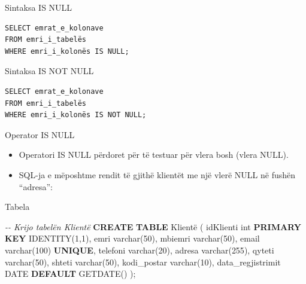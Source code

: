 \documentclass[
  ignorenonframetext,
]{beamer}
\newenvironment{Shaded}{\begin{snugshade}}{\end{snugshade}}
\newcommand{\CommentTok}[1]{\textcolor[rgb]{0.56,0.35,0.01}{\textit{#1}}}
\newcommand{\DataTypeTok}[1]{\textcolor[rgb]{0.13,0.29,0.53}{#1}}
\newcommand{\DecValTok}[1]{\textcolor[rgb]{0.00,0.00,0.81}{#1}}
\newcommand{\KeywordTok}[1]{\textcolor[rgb]{0.13,0.29,0.53}{\textbf{#1}}}
\newcommand{\NormalTok}[1]{#1}
\begin{document}
\begin{frame}[fragile]{Sintaksa IS NULL}
\label{sintaksa-is-null}

\begin{verbatim}
SELECT emrat_e_kolonave
FROM emri_i_tabelës
WHERE emri_i_kolonës IS NULL;
\end{verbatim}
\end{frame}

\begin{frame}[fragile]{Sintaksa IS NOT NULL}
\label{sintaksa-is-not-null}

\begin{verbatim}
SELECT emrat_e_kolonave
FROM emri_i_tabelës
WHERE emri_i_kolonës IS NOT NULL;

\end{verbatim}
\end{frame}

\begin{frame}{Operator IS NULL}
\label{operator-is-null}
\begin{itemize}
\item
  Operatori IS NULL përdoret për të testuar për vlera bosh (vlera NULL).
\item
  SQL-ja e mëposhtme rendit të gjithë klientët me një vlerë NULL në
  fushën ``adresa'':
\end{itemize}
\end{frame}

\begin{frame}[fragile]{Tabela}
\label{tabela}

\begin{Shaded}
\begin{Highlighting}[]
\CommentTok{{-}{-} Krijo tabelën Klientë}
\KeywordTok{CREATE} \KeywordTok{TABLE}\NormalTok{ Klientë (}
\NormalTok{  idKlienti }\DataTypeTok{int} \KeywordTok{PRIMARY} \KeywordTok{KEY}\NormalTok{ IDENTITY(}\DecValTok{1}\NormalTok{,}\DecValTok{1}\NormalTok{),}
\NormalTok{  emri }\DataTypeTok{varchar}\NormalTok{(}\DecValTok{50}\NormalTok{),}
\NormalTok{  mbiemri }\DataTypeTok{varchar}\NormalTok{(}\DecValTok{50}\NormalTok{),}
\NormalTok{  email }\DataTypeTok{varchar}\NormalTok{(}\DecValTok{100}\NormalTok{) }\KeywordTok{UNIQUE}\NormalTok{,}
\NormalTok{  telefoni }\DataTypeTok{varchar}\NormalTok{(}\DecValTok{20}\NormalTok{),}
\NormalTok{  adresa }\DataTypeTok{varchar}\NormalTok{(}\DecValTok{255}\NormalTok{),}
\NormalTok{  qyteti }\DataTypeTok{varchar}\NormalTok{(}\DecValTok{50}\NormalTok{),}
\NormalTok{  shteti }\DataTypeTok{varchar}\NormalTok{(}\DecValTok{50}\NormalTok{),}
\NormalTok{  kodi\_postar }\DataTypeTok{varchar}\NormalTok{(}\DecValTok{10}\NormalTok{),}
\NormalTok{  data\_regjistrimit }\DataTypeTok{DATE} \KeywordTok{DEFAULT}\NormalTok{ GETDATE()}
\NormalTok{);}
\end{Highlighting}
\end{Shaded}
\end{frame}
\end{document}
